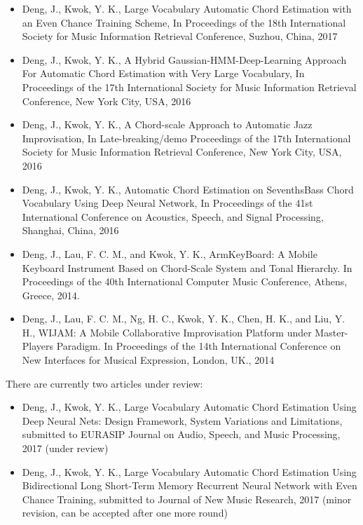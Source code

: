 \begin{itemize}
\item Deng, J., Kwok, Y. K., Large Vocabulary Automatic Chord Estimation with an Even Chance Training Scheme, In Proceedings of the 18th International Society for Music Information Retrieval Conference, Suzhou, China, 2017
\item Deng, J., Kwok, Y. K., A Hybrid Gaussian-HMM-Deep-Learning Approach For Automatic Chord Estimation with Very Large Vocabulary, In Proceedings of the 17th International Society for Music Information Retrieval Conference, New York City, USA, 2016
\item Deng, J., Kwok, Y. K., A Chord-scale Approach to Automatic Jazz Improvisation, In Late-breaking/demo Proceedings of the 17th International Society for Music Information Retrieval Conference, New York City, USA, 2016
\item Deng, J., Kwok, Y. K., Automatic Chord Estimation on SeventhsBass Chord Vocabulary Using Deep Neural Network, In Proceedings of the 41st International Conference on Acoustics, Speech, and Signal Processing, Shanghai, China, 2016
\item Deng, J., Lau, F. C. M., and Kwok, Y. K., ArmKeyBoard: A Mobile Keyboard Instrument Based on Chord-Scale System and Tonal Hierarchy. In Proceedings of the 40th International Computer Music Conference, Athens, Greece, 2014.
\item Deng, J., Lau, F. C. M., Ng, H. C., Kwok, Y. K., Chen, H. K., and Liu, Y. H., WIJAM: A Mobile Collaborative Improvisation Platform under Master-Players Paradigm. In Proceedings of the 14th International Conference on New Interfaces for Musical Expression, London, UK., 2014
\end{itemize}

There are currently two articles under review:
\begin{itemize}
\item Deng, J., Kwok, Y. K., Large Vocabulary Automatic Chord Estimation Using Deep Neural Nets: Design Framework, System Variations and Limitations, submitted to EURASIP Journal on Audio, Speech, and Music Processing, 2017 (under review)
\item Deng, J., Kwok, Y. K., Large Vocabulary Automatic Chord Estimation Using Bidirectional Long Short-Term Memory Recurrent Neural Network with Even Chance Training, submitted to Journal of New Music Research, 2017 (minor revision, can be accepted after one more round)
\end{itemize}



